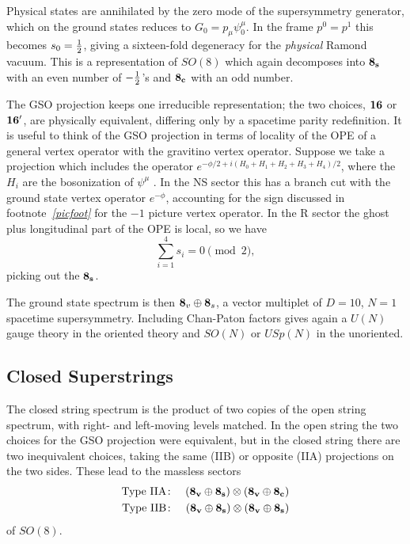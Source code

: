 \documentclass[12pt]{article}
\def\be{\begin{equation}}
\def\ee{\end{equation}}
\def\bea{\begin{eqnarray}}
\def\eea{\end{eqnarray}}
\def\ha{{\textstyle{1\over 2}}}
\begin{document}
Physical states are annihilated by the zero mode of the supersymmetry 
generator, which on the ground states
reduces to $G_0=p_{\mu}\psi^{\mu}_0$. In the frame $p^0 = p^1$ this
becomes $s_0 = \ha$,
giving a sixteen-fold degeneracy for the {\it physical} 
Ramond vacuum.  This is a representation of $SO(8)$ which again
decomposes into ${\bf 8_s}$ with an even number of $-\ha$'s and ${\bf
8_c}$ with an odd number.

The GSO projection keeps one irreducible representation; the two choices,
$\bf 16$ or $\bf 16'$, are physically equivalent, differing only by a
spacetime parity redefinition.
It is useful
to think of the GSO projection in terms of locality of the OPE of a general
vertex operator with the gravitino vertex operator.  Suppose we take a
projection which includes the operator $e^{-\phi/2 +
i(H_0+H_1+H_2+H_3+H_4)/2}$, where the
$H_i$ are the bosonization of $\psi^\mu$ \cite{fms}. In
the NS sector this has a branch cut with the ground state vertex operator
$e^{-\phi}$, accounting for the sign discussed in footnote~{\it\ref{picfoot}}
for the
$-1$ picture vertex operator.  In the R sector the ghost plus longitudinal
part of the OPE is local, so we have
\be
\sum_{i=1}^4 s_i = 0 \pmod 2,
\ee
picking out the ${\bf 8_s}$.

The ground state spectrum is then ${\bf 8}_v \oplus {\bf 8}_s$, a vector
multiplet of $D=10$, $N=1$ spacetime supersymmetry.  Including Chan-Paton
factors gives again a $U(N)$ gauge theory in the oriented theory and
$SO(N)$ or $USp(N)$ in the unoriented.

\subsection{Closed Superstrings}
The closed string spectrum is the product of two copies of the open
string spectrum, with right- and left-moving levels matched.
In the open string the two choices for the GSO projection were
equivalent, but in the closed string there are two inequivalent choices,
taking the same (IIB) or opposite (IIA) projections on the two sides.
These lead to the massless sectors
\bea
{\rm Type ~ IIA\colon} && ({\bf 8_v}\oplus{\bf 8_s}) \otimes
   ({\bf 8_v}\oplus{\bf 8_{c}}) \nonumber\\
{\rm Type ~ IIB\colon} && ({\bf 8_v}\oplus{\bf 8_s}) \otimes
   ({\bf 8_v}\oplus{\bf 8_{s}}) 
\eea
of $SO(8)$.  
\end{document}

